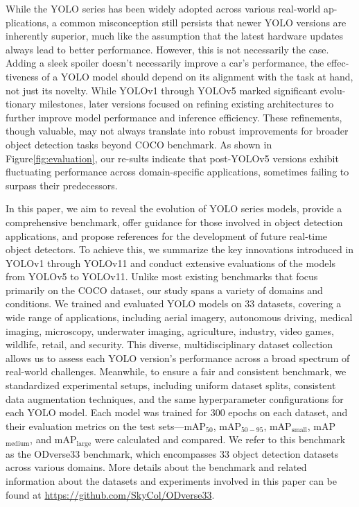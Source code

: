 \documentclass[runningheads]{llncs}
\begin{document}
While the YOLO series has been widely adopted across various real-world ap-plications, a common misconception still persists that newer YOLO versions are inherently superior, much like the assumption that the latest hardware updates always lead to better performance. However, this is not necessarily the case. Adding a sleek spoiler doesn't necessarily improve a car's performance, the effec-tiveness of a YOLO model should depend on its alignment with the task at hand, not just its novelty. While YOLOv1 through YOLOv5 marked significant evolu-tionary milestones, later versions focused on refining existing architectures to further improve model performance and inference efficiency. These refinements, though valuable, may not always translate into robust improvements for broader object detection tasks beyond COCO benchmark. As shown in Figure\ref{fig:evaluation}, our re-sults indicate that post-YOLOv5 versions exhibit fluctuating performance across domain-specific applications, sometimes failing to surpass their predecessors. 

In this paper, we aim to reveal the evolution of YOLO series models, provide a comprehensive benchmark, offer guidance for those involved in object detection applications, and propose references for the development of future real-time object detectors. To achieve this, we summarize the key innovations introduced in YOLOv1 through YOLOv11 and conduct extensive evaluations of the models from YOLOv5 to YOLOv11. Unlike most existing benchmarks that focus primarily on the COCO dataset, our study spans a variety of domains and conditions. We trained and evaluated YOLO models on 33 datasets, covering a wide range of applications, including aerial imagery, autonomous driving, medical imaging, microscopy, underwater imaging, agriculture, industry, video games, wildlife, retail, and security. This diverse, multidisciplinary dataset collection allows us to assess each YOLO version's performance across a broad spectrum of real-world challenges. Meanwhile, to ensure a fair and consistent benchmark, we standardized experimental setups, including uniform dataset splits, consistent data augmentation techniques, and the same hyperparameter configurations for each YOLO model. Each model was trained for 300 epochs on each dataset, and their evaluation metrics on the test sets—mAP$_{50}$, mAP$_{50-95}$, mAP$_{\text{small}}$, mAP$_{\text{medium}}$, and mAP$_{\text{large}}$ were calculated and compared. We refer to this benchmark as the ODverse33 benchmark, which encompasses 33 object detection datasets across various domains. More details about the benchmark and related information about the datasets and experiments involved in this paper can be found at \href{https://github.com/SkyCol/ODverse33}{https://github.com/SkyCol/ODverse33}.
\end{document}
